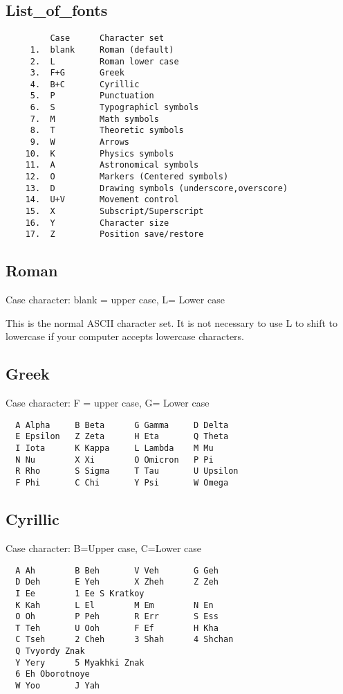 \subsection{List\_of\_fonts}
\begin{verbatim}
         Case      Character set 
     1.  blank     Roman (default) 
     2.  L         Roman lower case 
     3.  F+G       Greek 
     4.  B+C       Cyrillic 
     5.  P         Punctuation 
     6.  S         Typographicl symbols 
     7.  M         Math symbols 
     8.  T         Theoretic symbols 
     9.  W         Arrows 
    10.  K         Physics symbols 
    11.  A         Astronomical symbols 
    12.  O         Markers (Centered symbols) 
    13.  D         Drawing symbols (underscore,overscore) 
    14.  U+V       Movement control 
    15.  X         Subscript/Superscript 
    16.  Y         Character size 
    17.  Z         Position save/restore 
\end{verbatim}

\subsection{Roman}
Case character:  
blank = upper case, L= Lower case 

This  is the normal ASCII character set.  It is not necessary to use L to
shift to lowercase if your computer accepts lowercase characters.  
\subsection{Greek}
Case character:  
F = upper case, G= Lower case 
\begin{verbatim}
  A Alpha     B Beta      G Gamma     D Delta
  E Epsilon   Z Zeta      H Eta       Q Theta
  I Iota      K Kappa     L Lambda    M Mu
  N Nu        X Xi        O Omicron   P Pi
  R Rho       S Sigma     T Tau       U Upsilon
  F Phi       C Chi       Y Psi       W Omega
\end{verbatim}
\subsection{Cyrillic}
Case character:  
B=Upper case, C=Lower case 
\begin{verbatim}
  A Ah        B Beh       V Veh       G Geh
  D Deh       E Yeh       X Zheh      Z Zeh
  I Ee        1 Ee S Kratkoy
  K Kah       L El        M Em        N En
  O Oh        P Peh       R Err       S Ess
  T Teh       U Ooh       F Ef        H Kha
  C Tseh      2 Cheh      3 Shah      4 Shchan
  Q Tvyordy Znak
  Y Yery      5 Myakhki Znak
  6 Eh Oborotnoye
  W Yoo       J Yah
\end{verbatim}
